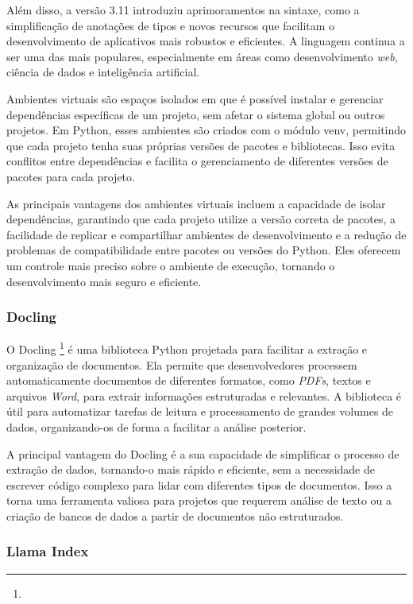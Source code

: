 \documentclass[a4paper, 12pt]{article}
\begin{document}
    Além disso, a versão 3.11 introduziu aprimoramentos na sintaxe, como a simplificação de anotações de tipos e novos recursos que facilitam o desenvolvimento de aplicativos mais robustos e eficientes. A linguagem continua a ser uma das mais populares, especialmente em áreas como desenvolvimento \textit{web}, ciência de dados e inteligência artificial.
    
    Ambientes virtuais são espaços isolados em que é possível instalar e gerenciar dependências específicas de um projeto, sem afetar o sistema global ou outros projetos. Em Python, esses ambientes são criados com o módulo venv, permitindo que cada projeto tenha suas próprias versões de pacotes e bibliotecas. Isso evita conflitos entre dependências e facilita o gerenciamento de diferentes versões de pacotes para cada projeto.

    As principais vantagens dos ambientes virtuais incluem a capacidade de isolar dependências, garantindo que cada projeto utilize a versão correta de pacotes, a facilidade de replicar e compartilhar ambientes de desenvolvimento e a redução de problemas de compatibilidade entre pacotes ou versões do Python. Eles oferecem um controle mais preciso sobre o ambiente de execução, tornando o desenvolvimento mais seguro e eficiente.

    \subsubsection{Docling} \label{sec:docling}

    O Docling \footnote{} é uma biblioteca Python projetada para facilitar a extração e organização de documentos. Ela permite que desenvolvedores processem automaticamente documentos de diferentes formatos, como \textit{PDFs}, textos e arquivos \textit{Word}, para extrair informações estruturadas e relevantes. A biblioteca é útil para automatizar tarefas de leitura e processamento de grandes volumes de dados, organizando-os de forma a facilitar a análise posterior.

    A principal vantagem do Docling é a sua capacidade de simplificar o processo de extração de dados, tornando-o mais rápido e eficiente, sem a necessidade de escrever código complexo para lidar com diferentes tipos de documentos. Isso a torna uma ferramenta valiosa para projetos que requerem análise de texto ou a criação de bancos de dados a partir de documentos não estruturados.

    \subsubsection{Llama Index} \label{sec:llama_index}
\end{document}
